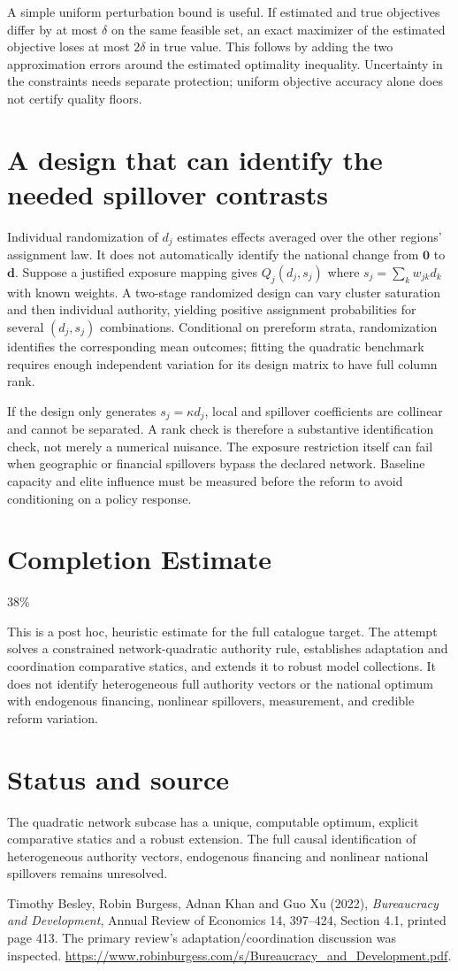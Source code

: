 \documentclass[11pt]{article}
\begin{document}
A simple uniform perturbation bound is useful. If estimated and true objectives differ by at most $\delta$ on the same feasible set, an exact maximizer of the estimated objective loses at most $2\delta$ in true value. This follows by adding the two approximation errors around the estimated optimality inequality. Uncertainty in the constraints needs separate protection; uniform objective accuracy alone does not certify quality floors.

\section*{A design that can identify the needed spillover contrasts}
Individual randomization of $d_j$ estimates effects averaged over the other regions' assignment law. It does not automatically identify the national change from $\mathbf0$ to $\mathbf d$. Suppose a justified exposure mapping gives $Q_j(d_j,s_j)$ where $s_j=\sum_kw_{jk}d_k$ with known weights. A two-stage randomized design can vary cluster saturation and then individual authority, yielding positive assignment probabilities for several $(d_j,s_j)$ combinations. Conditional on prereform strata, randomization identifies the corresponding mean outcomes; fitting the quadratic benchmark requires enough independent variation for its design matrix to have full column rank.

If the design only generates $s_j=\kappa d_j$, local and spillover coefficients are collinear and cannot be separated. A rank check is therefore a substantive identification check, not merely a numerical nuisance. The exposure restriction itself can fail when geographic or financial spillovers bypass the declared network. Baseline capacity and elite influence must be measured before the reform to avoid conditioning on a policy response.

\section{Completion Estimate}
38\%

This is a post hoc, heuristic estimate for the full catalogue target.
The attempt solves a constrained network-quadratic authority rule, establishes adaptation and coordination comparative statics, and extends it to robust model collections. It does not identify heterogeneous full authority vectors or the national optimum with endogenous financing, nonlinear spillovers, measurement, and credible reform variation.

\section*{Status and source}
The quadratic network subcase has a unique, computable optimum, explicit comparative statics and a robust extension. The full causal identification of heterogeneous authority vectors, endogenous financing and nonlinear national spillovers remains unresolved.

Timothy Besley, Robin Burgess, Adnan Khan and Guo Xu (2022), \emph{Bureaucracy and Development}, Annual Review of Economics 14, 397--424, Section 4.1, printed page 413. The primary review's adaptation/coordination discussion was inspected. \url{https://www.robinburgess.com/s/Bureaucracy_and_Development.pdf}.
\end{document}
